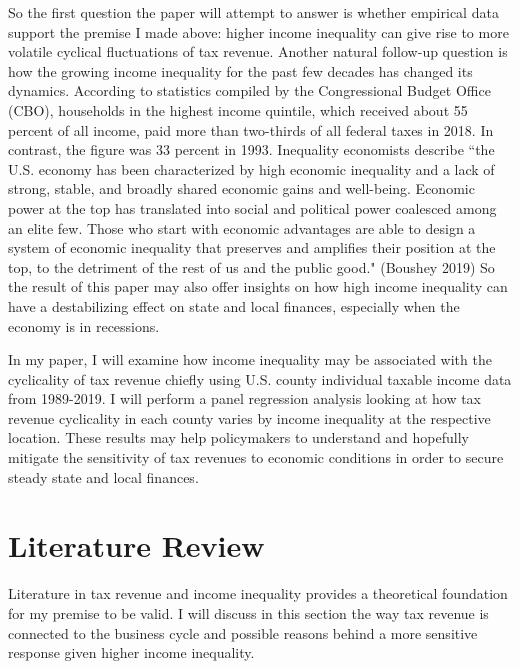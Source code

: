 \documentclass{article}
\begin{document}
So the first question the paper will attempt to answer is whether empirical data support the premise I made above: higher income inequality can give rise to more volatile cyclical fluctuations of tax revenue. Another natural follow-up question is how the growing income inequality for the past few decades has changed its dynamics. According to statistics compiled by the Congressional Budget Office (CBO), households in the highest income quintile, which received about 55 percent of all income, paid more than two-thirds of all federal taxes in 2018. In contrast, the figure was 33 percent in 1993. Inequality economists describe ``the U.S. economy has been characterized by high economic inequality and a lack of strong, stable, and broadly shared economic gains and well-being. Economic power at the top has translated into social and political power coalesced among an elite few. Those who start with economic advantages are able to design a system of economic inequality that preserves and amplifies their position at the top, to the detriment of the rest of us and the public good." (Boushey 2019) So the result of this paper may also offer insights on how high income inequality can have a destabilizing effect on state and local finances, especially when the economy is in recessions. 

In my paper, I will examine how income inequality may be associated with the cyclicality of tax revenue chiefly using U.S. county individual taxable income data from 1989-2019. I will perform a panel regression analysis looking at how tax revenue cyclicality in each county varies by income inequality at the respective location. These results may help policymakers to understand and hopefully mitigate the sensitivity of tax revenues to economic conditions in order to secure steady state and local finances. 







\vspace{2mm}
\section{Literature Review}

Literature in tax revenue and income inequality provides a theoretical foundation for my premise to be valid. I will discuss in this section the way tax revenue is connected to the business cycle and possible reasons behind a more sensitive response given higher income inequality. 
\end{document}
